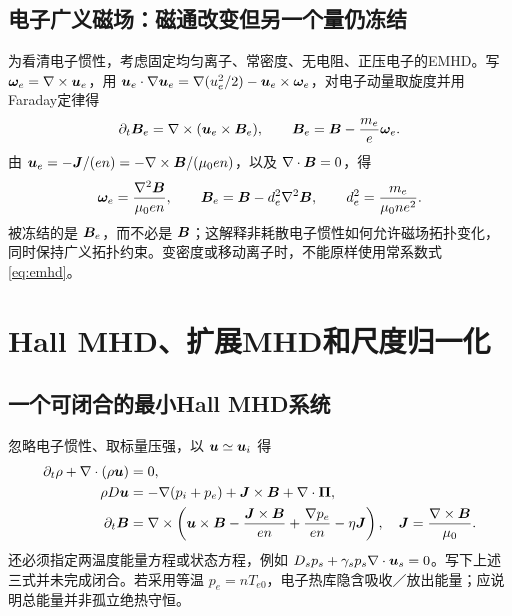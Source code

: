 \subsection{电子广义磁场：磁通改变但另一个量仍冻结}
为看清电子惯性，考虑固定均匀离子、常密度、无电阻、正压电子的EMHD。写 $\bm{\omega}_e=\nabla\times\bm{u}_e$，用
$\bm{u}_e\cdot\nabla\bm{u}_e=\nabla(u_e^2/2)-\bm{u}_e\times\bm{\omega}_e$，对电子动量取旋度并用Faraday定律得
\begin{equation}\partial_t\bm{B}_e=\nabla\times(\bm{u}_e\times\bm{B}_e),\qquad
\bm{B}_e=\bm{B}-{m_e\over e}\bm{\omega}_e.\label{eq:be}
\end{equation}
由 $\bm{u}_e=-\bm{J}/(en)=-\nabla\times\bm{B}/(\mu_0en)$，以及 $\nabla\cdot\bm{B}=0$，得
\begin{equation}\bm{\omega}_e={\nabla^2\bm{B}\over\mu_0en},\qquad
\bm{B}_e=\bm{B}-d_e^2\nabla^2\bm{B},\qquad d_e^2={m_e\over\mu_0ne^2}.\label{eq:emhd}
\end{equation}
被冻结的是 $\bm{B}_e$，而不必是 $\bm{B}$；这解释非耗散电子惯性如何允许磁场拓扑变化，同时保持广义拓扑约束。变密度或移动离子时，不能原样使用常系数式\eqref{eq:emhd}。



\section{Hall MHD、扩展MHD和尺度归一化}
\subsection{一个可闭合的最小Hall MHD系统}
忽略电子惯性、取标量压强，以 $\bm{u}\simeq\bm{u}_i$ 得
\begin{align}
\partial_t\rho+\nabla\cdot(\rho\bm{u})&=0,\\
\rho D\bm{u}&=-\nabla(p_i+p_e)+\bm{J}\times\bm{B}+\nabla\cdot\bm{\Pi},\\
\partial_t\bm{B}&=\nabla\times\left(\bm{u}\times\bm{B}-{\bm{J}\times\bm{B}\over en}+{\nabla p_e\over en}-\eta\bm{J}\right),\quad\bm{J}={\nabla\times\bm{B}\over\mu_0}.\label{eq:hallinduction}
\end{align}
还必须指定两温度能量方程或状态方程，例如 $D_sp_s+\gamma_sp_s\nabla\cdot\bm{u}_s=0$。写下上述三式并未完成闭合。若采用等温 $p_e=nT_{e0}$，电子热库隐含吸收／放出能量；应说明总能量并非孤立绝热守恒。

